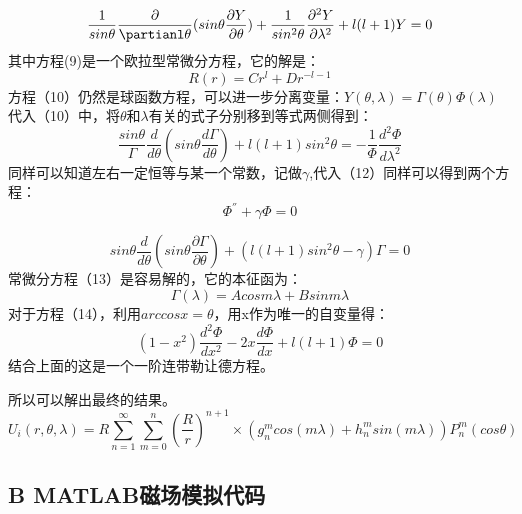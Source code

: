 \documentclass{article}
\begin{document}
 \begin{equation}
        \frac{1}{sin\theta}\frac{\partial}{\partianl\theta}(sin\theta\frac{\partial{Y}}{\partial\theta})+\frac{1}{sin^2\theta}\frac{\partial^2Y}{\partial\lambda^2}+l(l+1)Y=0
 \end{equation}
 其中方程(9)是一个欧拉型常微分方程，它的解是：
  \begin{equation}
      R(r)=Cr^{l} + Dr^{-l-1}
  \end{equation}
  方程（10）仍然是球函数方程，可以进一步分离变量：$Y(\theta,\lambda)=\Gamma(\theta)\Phi(\lambda)$
 代入（10）中，将$\theta$和$\lambda$有关的式子分别移到等式两侧得到：
 \begin{equation}
     \frac{sin\theta}{\Gamma}\frac{d}{d\theta}(sin\theta\frac{d\Gamma}{d\theta})+l(l+1)sin^2\theta=-\frac{1}{\Phi}\frac{d^2\Phi}{d\lambda^2}
 \end{equation}
 同样可以知道左右一定恒等与某一个常数，记做$\gamma$,代入（12）同样可以得到两个方程：
\begin{equation}
    \Phi^{''} + \gamma\Phi = 0
\end{equation}

\begin{equation}
    sin\theta\frac{d}{d\theta}(sin\theta\frac{\partial{\Gamma}}{\partial\theta})+(l(l+1)sin^2\theta-\gamma)\Gamma=0
\end{equation}
常微分方程（13）是容易解的，它的本征函为：
\begin{equation}
    \Gamma(\lambda)=Acosm\lambda+Bsinm\lambda
\end{equation}
对于方程（14），利用$arccosx=\theta$，用x作为唯一的自变量得：
\begin{equation}
    (1-x^2)\frac{d^2\Phi}{dx^2} - 2x\frac{d\Phi}{dx}+l(l+1)\Phi=0
\end{equation}
结合上面的这是一个一阶连带勒让德方程。

所以可以解出最终的结果。
\begin{equation}
    U_i(r, \theta,\lambda)=R\sum_{n=1}^{\infty}\sum_{m=0}^{n}(\frac{R}{r})^{n+1}\times(g_{n}^{m}cos(m\lambda)+h_{n}^{m}sin(m\lambda))P^{m}_{n}(cos\theta)
\end{equation}



\subsection*{B MATLAB磁场模拟代码}
\end{document}
